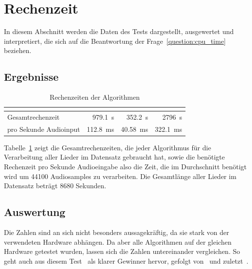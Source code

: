 \section{Rechenzeit}
{
	In diesem Abschnitt werden die Daten des Tests dargestellt, ausgewertet und interpretiert,
		die sich auf die Beantwortung der Frage~\ref{question:cpu_time} beziehen.

	\subsection{Ergebnisse}
	{
		\begin{table}[h]
			\centering
			\begin{tabular}{l | r | r | r}
				                       & \cite{2001_BeatThis} & \cite{2009_DaPlSt}   & \cite{2011_PlRoSt} \\
				\hline \hline
				Gesamtrechenzeit       & \SI{979.1}{\second}  & \SI{352.2}{\second} & \SI{2796}{\second} \\
				pro Sekunde Audioinput & \SI{112.8}{\milli\second} & \SI{40.58}{\milli\second} & \SI{322.1}{\milli\second}
			\end{tabular}
			\caption{Rechenzeiten der Algorithmen}
			\label{tab:cputime}
		\end{table}

		Tabelle~\ref{tab:cputime} zeigt die Gesamtrechenzeiten,
			die jeder Algorithmus für die Verarbeitung aller Lieder im Datensatz gebraucht hat,
			sowie die benötigte Rechenzeit pro Sekunde Audioeingabe
			also die Zeit,
			die im Durchschnitt benötigt wird um \num{44100} Audiosamples zu verarbeiten.
		Die Gesamtlänge aller Lieder im Datensatz beträgt \num{8680} Sekunden.
	}

	\subsection{Auswertung}
	{
		Die Zahlen sind an sich nicht besonders aussagekräftig,
			da sie stark von der verwendeten Hardware abhängen.
		Da aber alle Algorithmen auf der gleichen Hardware getestet wurden,
			lassen sich die Zahlen untereinander vergleichen.
		So geht auch aus diesem Test~\cite{2009_DaPlSt} als klarer Gewinner hervor,
			gefolgt von~\cite{2001_BeatThis} und zuletzt~\cite{2011_PlRoSt}.

}}
